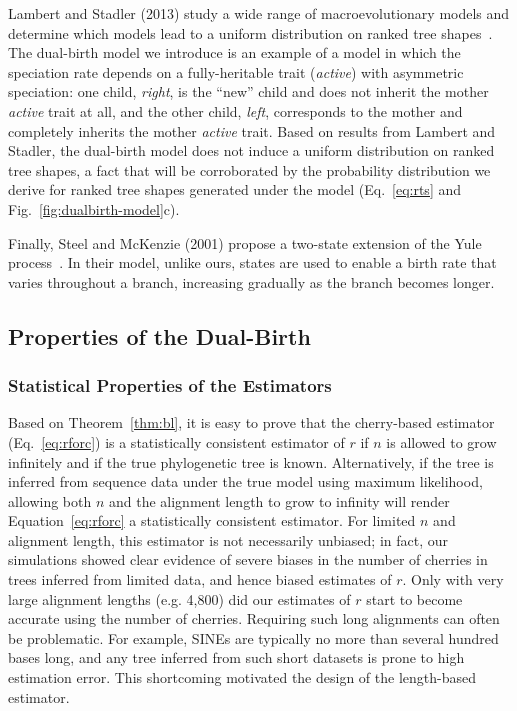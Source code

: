 Lambert and Stadler (2013) study a wide range of macroevolutionary models and
determine which models lead to a uniform distribution on ranked tree shapes~\cite{Lambert2013}. The dual-birth model we introduce is an example of a model in which the speciation rate depends on a fully-heritable trait (\textit{active}) with asymmetric speciation: one child, \textit{right}, is the ``new'' child and does not inherit the mother \textit{active} trait at all, and the other child, \textit{left}, corresponds to the mother and completely inherits the mother \textit{active} trait. Based on results from Lambert and Stadler, the dual-birth model does not induce a uniform distribution on ranked tree shapes, a fact that will be corroborated by the probability distribution we derive for ranked tree shapes generated under the model (Eq.~\ref{eq:rts} and Fig.~\ref{fig:dualbirth-model}c).

Finally, Steel and McKenzie (2001) propose a two-state extension of the Yule process~\cite{Steel2001}. In their model, unlike ours, states are used to enable a birth rate that varies throughout a branch, increasing gradually as the branch becomes longer.

\subsection{Properties of the Dual-Birth}
\subsubsection{Statistical Properties of the Estimators}\label{sec:dualbirth-estimator-properties}
Based on Theorem~\ref{thm:bl}, it is easy to prove that the cherry-based estimator (Eq.~\ref{eq:rforc}) is a statistically consistent estimator of $r$ if $n$ is allowed to grow infinitely and if the true phylogenetic tree is known. Alternatively, if the tree is inferred from sequence data under the true model using maximum likelihood, allowing both $n$ and the alignment length to grow to infinity will render Equation~\ref{eq:rforc} a statistically consistent estimator. For limited $n$ and alignment length, this estimator is not necessarily unbiased; in fact, our simulations showed clear evidence of severe biases in the number of cherries in trees inferred from limited data, and hence biased estimates of $r$. Only with very large alignment lengths (e.g. 4,800) did our estimates of $r$ start to become accurate using the number of cherries. Requiring such long alignments can often be problematic. For example, \glspl{SINE} are typically no more than several hundred bases long, and any tree inferred from such short datasets is prone to high estimation error. This shortcoming motivated the design of the length-based estimator.

